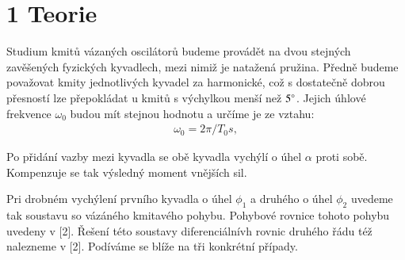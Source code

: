 \documentclass[a4paper]{article}
\begin{document}
\section*{1 Teorie}
\par Studium kmitů vázaných oscilátorů budeme provádět na dvou stejných zavěšených fyzických kyvadlech, mezi nimiž je natažená pružina. Předně budeme považovat kmity jednotlivých kyvadel za harmonické, což s dostatečně dobrou přesností lze přepokládat u kmitů s výchylkou menší než $5\degree$. Jejich úhlové frekvence $\omega_0$ budou mít stejnou hodnotu a určíme je ze vztahu: 
\begin{align}
\omega_0 = 2\pi/T_0s,   
\end{align}
\par Po přidání vazby mezi kyvadla se obě kyvadla vychýlí o úhel $\alpha$ proti sobě. Kompenzuje se tak výsledný moment vnějších sil. 
\par Pri drobném vychýlení prvního kyvadla o úhel $\phi_1$ a druhého o úhel $\phi_2$ uvedeme tak soustavu so vázáného kmitavého pohybu. Pohybové rovnice tohoto pohybu uvedeny v [2]. Řešení této soustavy diferenciálnívh rovnic druhého řádu též nalezneme v [2]. Podíváme se blíže na tři konkrétní případy.
\end{document}
